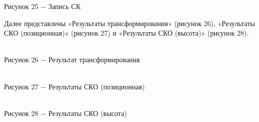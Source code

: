 \documentclass[a4paper]{article}
\begin{document}
{\begin{center}
    Рисунок 25 $-$ Запись СК  
\end{center}
\par Далее представлены «Результаты трансформирования» (рисунок 26), «Результаты СКО (позиционная)» (рисунок 27) и «Результаты СКО (высота)» (рисунок 28).
\begin{center}
     \\
    Рисунок 26 $-$ Результат трансформирования  
\end{center}
\begin{center}
     \\
    Рисунок 27 $-$ Результаты СКО (позиционная)  
\end{center}
\begin{center}
     \\
    Рисунок 28 $-$ Результаты СКО (высота)  
\end{center}
}
\end{document}
